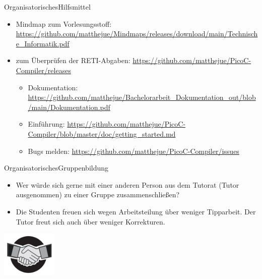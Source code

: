 \begin{frame}{Organisatorisches}{Hilfsmittel}
  \begin{itemize}
    \item \alert{Mindmap zum Vorlesungsstoff:} \url{https://github.com/matthejue/Mindmaps/releases/download/main/Technische_Informatik.pdf}
    \item \alert{zum Überprüfen der RETI-Abgaben:} \url{https://github.com/matthejue/PicoC-Compiler/releases}
    \begin{itemize}
      \item \alert{Dokumentation:} \url{https://github.com/matthejue/Bachelorarbeit_Dokumentation_out/blob/main/Dokumentation.pdf}
      \item \alert{Einführung:} \url{https://github.com/matthejue/PicoC-Compiler/blob/master/doc/getting_started.md}
      \item \alert{Bugs melden:} \url{https://github.com/matthejue/PicoC-Compiler/issues}
    \end{itemize}
  \end{itemize}
\end{frame}

\begin{frame}{Organisatorisches}{Gruppenbildung}
  \begin{itemize}
    \item Wer würde sich gerne mit einer \alert{anderen Person} aus dem Tutorat (Tutor ausgenommen) zu einer \alert{Gruppe zusammenschließen}?
    \item Die \alert{Studenten} freuen sich wegen \alert{Arbeitsteilung} über \alert{weniger Tipparbeit}. Der \alert{Tutor} freut sich auch über \alert{weniger Korrekturen}.
  \end{itemize}
  \includegraphics[width=0.2\textwidth, center]{./figures/vereinbarung.png}
\end{frame}
